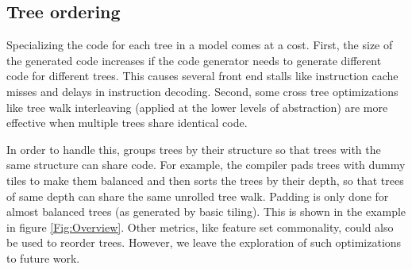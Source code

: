 \subsection{Tree ordering}
\label{sec:treeorder}	
Specializing the code for each tree in a model comes at a cost. First, the size of the generated code increases if the
code generator needs to generate different code for different trees. This causes several front end stalls like instruction 
cache misses and delays in instruction decoding. Second, some cross tree optimizations 
like tree walk interleaving (applied at the lower levels of abstraction) are more effective when multiple trees share identical code. 

In order to handle this, \Treebeard{} groups trees by their structure so that trees with the same structure can 
share code. For example, the compiler pads trees with dummy tiles to make them balanced and then sorts the trees by 
their depth, so that trees of same depth can share the same unrolled tree walk. Padding is only done for almost balanced trees (as generated 
by basic tiling). This is shown in the example in figure \ref{Fig:Overview}. Other metrics, like feature set commonality, 
could also be used to reorder trees\cite{Tahoe}. However, we leave the exploration of such optimizations to future work.

